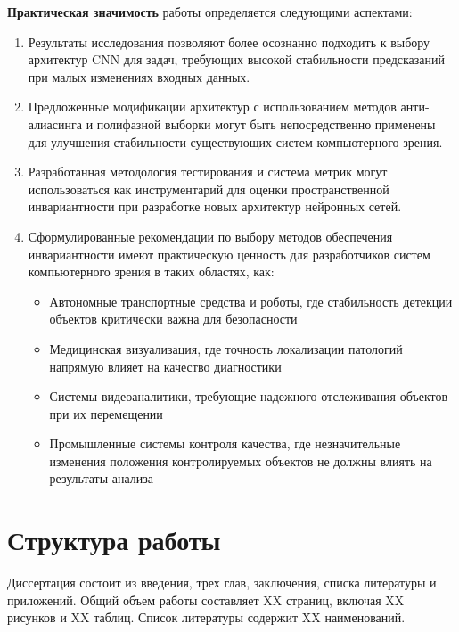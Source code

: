 \textbf{Практическая значимость} работы определяется следующими аспектами:

\begin{enumerate}
    \item Результаты исследования позволяют более осознанно подходить к выбору архитектур CNN для задач, требующих высокой стабильности предсказаний при малых изменениях входных данных.
    
    \item Предложенные модификации архитектур с использованием методов анти-алиасинга и полифазной выборки могут быть непосредственно применены для улучшения стабильности существующих систем компьютерного зрения.
    
    \item Разработанная методология тестирования и система метрик могут использоваться как инструментарий для оценки пространственной инвариантности при разработке новых архитектур нейронных сетей.
    
    \item Сформулированные рекомендации по выбору методов обеспечения инвариантности имеют практическую ценность для разработчиков систем компьютерного зрения в таких областях, как:
    \begin{itemize}
        \item Автономные транспортные средства и роботы, где стабильность детекции объектов критически важна для безопасности
        \item Медицинская визуализация, где точность локализации патологий напрямую влияет на качество диагностики
        \item Системы видеоаналитики, требующие надежного отслеживания объектов при их перемещении
        \item Промышленные системы контроля качества, где незначительные изменения положения контролируемых объектов не должны влиять на результаты анализа
    \end{itemize}
\end{enumerate}

\section*{Структура работы}
\label{intro:structure}

Диссертация состоит из введения, трех глав, заключения, списка литературы и приложений. Общий объем работы составляет XX страниц, включая XX рисунков и XX таблиц. Список литературы содержит XX наименований.

